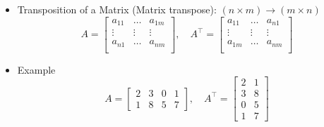 \documentclass[8pt,dvipsnames]{beamer}
\begin{document}
\begin{frame}
  \begin{itemize}
  \item Transposition of a Matrix (Matrix transpose): $(n\times m) \to (m\times n)$
    $$
    A =
    \begin{bmatrix}
      a_{11}&\dots& a_{1m}\\
      \vdots & \vdots & \vdots\\
      a_{n1}&\dots& a_{nm}\\
    \end{bmatrix},\quad
    A^\top = 
    \begin{bmatrix}
      a_{11}&\dots& a_{n1}\\
      \vdots & \vdots & \vdots\\
      a_{1m}&\dots& a_{nm}\\
    \end{bmatrix}
    $$\vfill
  \item Example
    $$
    A =
    \begin{bmatrix}
      2 & 3 & 0 & 1\\
      1 & 8 & 5 & 7
    \end{bmatrix},\quad
    A^\top = 
    \begin{bmatrix}
      2 & 1\\ 3 & 8\\ 0 & 5\\ 1 & 7
    \end{bmatrix}
    $$
  \end{itemize}
\end{frame}
\end{document}
